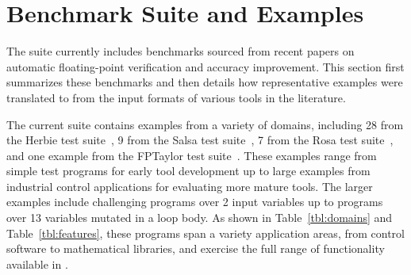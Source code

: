 \documentclass[main.tex]{subfiles}
\begin{document}
\section{Benchmark Suite and Examples}
\label{sec:case-studies}

The \name suite currently includes \nbenches benchmarks
  sourced from recent papers on automatic floating-point
  verification and accuracy improvement.
This section first summarizes these benchmarks
  and then details how representative examples
  were translated to \name from the input formats
  of various tools in the literature.



The current \name suite contains
  examples from a variety of domains, including
  28 from the Herbie test suite~\cite{pavel15},
  9 from the Salsa test suite~\cite{fmics15},
  7 from the Rosa test suite~\cite{DarulovaK14},
  and one example from the FPTaylor test suite~\cite{fptaylor-fm15}.
These examples range from simple test programs for
  early tool development up to
  large examples from industrial control applications for
  evaluating more mature tools.
The larger examples include challenging
  programs over 2 input variables up to
  programs over 13 variables mutated in a loop body.
As shown in Table~\ref{tbl:domains} and Table~\ref{tbl:features},
  these programs span a variety application areas,
  from control software to mathematical libraries,
  and exercise the full range of functionality
  available in \name.
\end{document}
